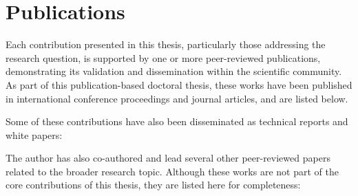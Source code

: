\chapter*{Publications}
Each contribution presented in this thesis, particularly those addressing the research question, is supported by one or more peer-reviewed publications, demonstrating its validation and dissemination within the scientific community. As part of this publication-based doctoral thesis, these works have been published in international conference proceedings and journal articles, and are listed below.
\begin{refsection}
\nocite{10.1007/978-3-032-08887-1_4,10706345,11124121,trust-aidatatrust,10.1007/978-3-032-19096-3_17,patas}
\begin{refcontext}[labelprefix=P]
\printbibliography[category=ouattara,heading=none]
\end{refcontext}
\end{refsection}

Some of these contributions have also been disseminated as technical reports and white papers:
\begin{refsection}
\nocite{connect_d31_taf,5gaa_trust4cav_2025}
\begin{refcontext}[labelprefix=W]
\printbibliography[category=ouattaraRep,heading=none]
\end{refcontext}
\end{refsection}


The author has also co-authored and lead several other peer-reviewed papers related to the broader research topic. Although these works are not part of the core contributions of this thesis, they are listed here for completeness:

\begin{refsection}
\nocite{fotos2025actions,snn}
\begin{refcontext}[labelprefix=K]
\printbibliography[category=ouattaraAll,heading=none]
\end{refcontext}
\end{refsection}

